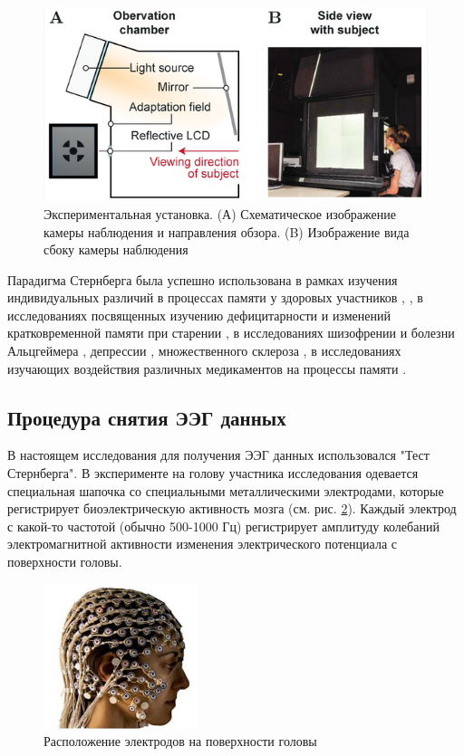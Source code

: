 \vspace*{10 mm}
\begin{figure}[H]
    \centering
    \includegraphics[width=0.6\linewidth]{images/1.png}
    \caption{Экспериментальная установка. (А) Схематическое изображение камеры наблюдения и
    направления обзора. (B) Изображение вида сбоку камеры наблюдения \cite{sternberg_paradigm}}
    \label{fig_1}
\end{figure}

\vspace*{5 mm}
Парадигма Стернберга была успешно использована в рамках изучения индивидуальных различий в
процессах памяти у здоровых участников \cite{paradigm_1}, \cite{paradigm_2}, в
исследованиях посвященных изучению дефицитарности и изменений кратковременной памяти при
старении \cite{paradigm_3}, в исследованиях шизофрении и болезни
Альцгеймера \cite{paradigm_4}, депрессии \cite{paradigm_5}, множественного склероза \cite{paradigm_6}, в
исследованиях изучающих воздействия различных медикаментов на процессы памяти \cite{paradigm_7}.\\[0.5 cm]

\subsection{Процедура снятия ЭЭГ данных}
\label{sec:chapter_2_2}

\vspace*{10 mm}
В настоящем исследования для получения ЭЭГ данных использовался "Тест Стернберга".
В эксперименте на голову участника исследования одевается специальная шапочка со специальными
металлическими электродами, которые регистрирует биоэлектрическую активность мозга (см. рис.
\ref{fig_2}). Каждый электрод с какой-то частотой (обычно 500-1000 Гц) регистрирует амплитуду
колебаний электромагнитной активности изменения электрического потенциала с поверхности головы. 

\begin{figure}
    \centering
    \includegraphics[width=0.4\textwidth]{images/2.png}
    \caption{Расположение электродов на поверхности головы}
    \label{fig_2}
\end{figure}

